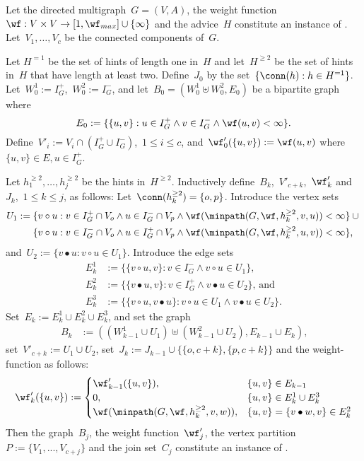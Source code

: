 \begin{construction}
  \label{con:redwmeeatocbm}
  Let the directed multigraph~$G=(V,A)$, the weight function~$\wf: V \times V \rightarrow [1, \wf_{max}]\cup \{\infty\}$ and the advice~$H$ constitute an instance of \pWMEECCLAs . Let~$V_1, \ldots, V_c$ be the connected components of~$G$.
  
  Let $H^{=1}$ be the set of hints of length one in~$H$ and let~$H^{\geq 2}$ be the set of hints in~$H$ that have length at least two. Define~$J_0$ by the set~$\{\conn(h): h \in H^{=1}\}$. Let~$W^1_0 := I_G^+$,~$W^2_0 := I_G^-$, and let~$B_0 =(W^1_0 \uplus W^2_0, E_0)$ be a bipartite graph where~\[E_0 := \{\{u, v\} : u \in I_G^+ \wedge v \in I_G^- \wedge \wf(u, v) < \infty\} \text{.}\] Define~$V'_i := V_i \cap (I^+_G \cup I^-_G)$,~$1 \leq i \leq c$, and~$\wf'_0(\{u, v\}):=\wf(u, v)$ where~$\{u,v\} \in E, u \in I_G^+$.

  Let $h^{\geq 2}_1, \ldots, h^{\geq 2}_j$ be the hints in~$H^{\geq 2}$. Inductively define~$B_k$,~$V'_{c+k}$,~$\wf'_k$ and~$J_k$,~$1 \leq k \leq j$, as follows: Let~$\conn(h^{\geq 2}_k)=\{o, p\}$. Introduce the vertex sets 
\begin{align*}
  U_1 & := \{v \circ u : v \in I^+_G \cap V_o \wedge u \in I^-_G \cap V_p \wedge \wf(\minpath(G, \wf, h^{\geq 2}_k, v, u)) < \infty\} \cup {} \\
      & \phantom{{}:={}} \{v \circ u : v \in I^-_G \cap V_o \wedge u \in I^+_G \cap V_p \wedge \wf(\minpath(G, \wf, h^{\geq 2}_k, u, v)) < \infty\} \text{,}
\end{align*}
and~$U_2 := \{v \bullet u : v \circ u \in U_1\}$. Introduce the edge sets
\begin{align*}
  E_k^1 &:= \{\{v \circ u, v\} : v \in I^-_G \wedge v \circ u \in U_1\} \text{,} \\
  E_k^2 &:= \{\{v \bullet u, v\} : v \in I^+_G \wedge v \bullet u \in U_2\} \text{, and} \\
  E_k^3 &:= \{\{v \circ u, v \bullet u\}: v \circ u \in U_1 \wedge v \bullet u \in U_2 \} \text{.}
\end{align*}
Set~$E_k := E_k^1 \cup E_k^2 \cup E_k^3$, and set the graph
\begin{align*}
  B_k & := ((W^{1}_{k - 1} \cup U_1) \uplus (W^2_{k - 1} \cup U_2), E_{k-1} \cup E_k) \text{,}
\end{align*}
set~$V'_{c+k} := U_1 \cup U_2$, set~$J_k := J_{k-1} \cup \{\{o, c+k\}, \{p, c+k\}\}$ and the weight-function as follows:  
\[\wf'_k(\{u, v\}) := \begin{cases}
  \wf'_{k-1}(\{u, v\}), & \{u, v\} \in E_{k-1} \\
  0, & \{u, v\} \in E_k^1 \cup E_k^3 \\
  \wf(\minpath(G, \wf, h^{\geq 2}_k, v, w)), & \{u, v\} = \{v \bullet w, v\} \in E_k^2
\end{cases}
\]
Then the graph~$B_j$, the weight function~$\wf'_j$, the vertex partition~$P := \{V_1, ..., V_{c+j}\}$ and the join set~$C_j$ constitute an instance of \pCBMs .\end{construction}

